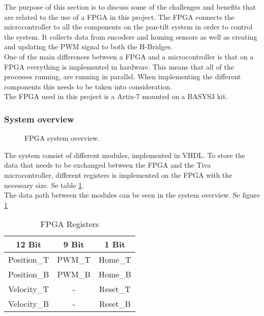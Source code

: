 \documentclass[../../../main]{subfiles}
\begin{document}
The purpose of this section is to discuss some of the challenges and benefits that are related to the use of a FPGA in this project.
The FPGA connects the microcontroller to all the components on the pan-tilt system in order to control the system. It collects data from encoders and homing sensors as well as creating and updating the PWM signal to both the H-Bridges.
\\
One of the main differences between a FPGA and a microcontroller is that on a FPGA everything is implemented in hardware. This means that all of the processes running, are running in parallel. When implementing the different components this needs to be taken into consideration. 
\\
The FPGA used in this project is a Artix-7 mounted on a BASYS3 kit. 
\subsubsection{System overview}%
\label{sub:system_overview}

\begin{figure}[H]
  \centering
  \def\svgwidth{\textwidth}
  
  \caption{FPGA system overview.}
  \label{fig:FPGA_system_overview}
\end{figure}
The system consist of different modules, implemented in VHDL.
To store the data that needs to be exchanged between the FPGA and the Tiva microcontroller, different registers is implemented on the FPGA with the necessary size. Se table \ref{table:FPGA_registers}. 
\\
The data path between the modules can be seen in the system overview. Se figure \ref{fig:FPGA_system_overview}
\begin{table}[H]
\centering
\begin{tabular}{|c|c|c|}
\hline
\textbf{12 Bit} & \textbf{9 Bit} & \textbf{1 Bit} \\ \hline
Position\_T     & PWM\_T         & Home\_T        \\ \hline
Position\_B     & PWM\_B         & Home\_B        \\ \hline
Velocity\_T     & -              & Reset\_T       \\ \hline
Velocity\_B     & -              & Reset\_B       \\ \hline
\end{tabular}
\caption{FPGA Registers}
\label{table:FPGA_registers}
\end{table}
\end{document}
